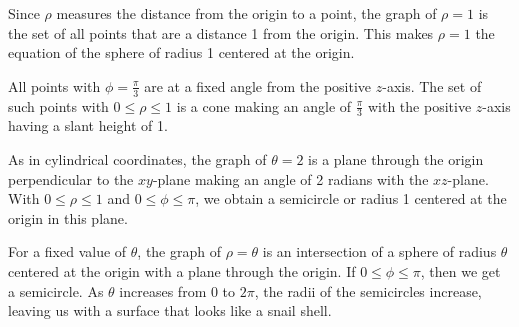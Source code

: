 \begin{activitySolution}
    \ba
    \item Since $\rho$ measures the distance from the origin to a point, the graph of $\rho = 1$ is the set of all points that are a distance 1 from the origin. This makes $\rho=1$ the equation of the sphere of radius 1 centered at the origin. 

    \item All points with $\phi = \frac{\pi}{3}$ are at a fixed angle from the positive $z$-axis. The set of such points with $0 \leq \rho \leq 1$ is a cone making an angle of $\frac{\pi}{3}$ with the positive $z$-axis having a slant height of 1. 

    \item As in cylindrical coordinates, the graph of $\theta = 2$ is a plane through the origin perpendicular to the $xy$-plane making an angle of 2 radians with the $xz$-plane. With $0 \leq \rho \leq 1$ and $0 \leq \phi \leq \pi$, we obtain a semicircle or radius 1 centered at the origin in this plane.


    \item For a fixed value of $\theta$, the graph of $\rho=\theta$ is an intersection of a sphere of radius $\theta$ centered at the origin with a plane through the origin. If $0 \leq \phi \leq \pi$, then we get a semicircle. As $\theta$ increases from $0$ to $2\pi$, the radii of the semicircles increase, leaving us with a surface that looks like a snail shell. 

    \ea
\end{activitySolution}
\aftera
